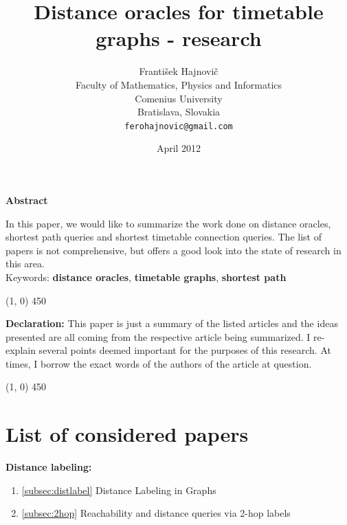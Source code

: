 \documentclass[a4paper]{article}
\renewenvironment{abstract}[1]
{
	\Large
	\begin{center}
		\textbf{#1}
	\end{center}
	
	\normalsize
	
	\addtolength{\leftskip}{1in}
	\addtolength{\rightskip}{1in}
	\setlength{\parindent}{0in}
}
{
}
\begin{document}
    \thispagestyle{empty}
    \title{\textbf{Distance oracles for timetable graphs - research}}
    \author{František Hajnovič \\
    Faculty of Mathematics, Physics and Informatics \\
    Comenius University \\
    Bratislava, Slovakia \\
    \texttt{ferohajnovic@gmail.com}}
    \date{April 2012}
    \maketitle

    \vskip 0.5cm

    \begin{abstract}{Abstract}
        In this paper, we would like to summarize the work done on distance oracles, shortest path queries and shortest timetable connection queries. The list of papers is not comprehensive, but offers a good look into the state of research in this area. \\

		Keywords: \textbf{distance oracles}, \textbf{timetable graphs}, \textbf{shortest path}
 	\end{abstract}	

    \begin{center}
        \line(1, 0) {450}
    \end{center}

    \textbf{Declaration:} This paper is just a summary of the listed articles and the ideas presented are all coming from the respective article being summarized. I re-explain several points deemed important for the purposes of this research. At times, I borrow the exact words of the authors of the article at question.

    \begin{center}
        \line(1, 0) {450}
    \end{center}

    \section{List of considered papers}
        \textbf{Distance labeling: }
        \begin{enumerate}
            \item \ref{subsec:distlabel} Distance Labeling in Graphs ~\cite{distlabel04}
            \item \ref{subsec:2hop} Reachability and distance queries via 2-hop labels ~\cite{2hop03}
        \end{enumerate}
        \hspace*{\fill}
\end{document}
